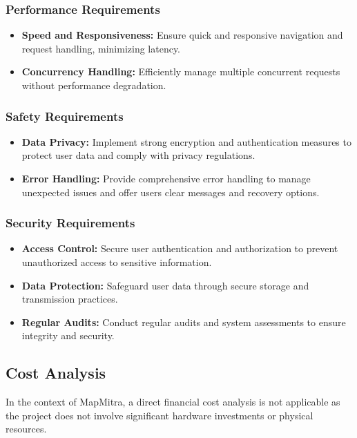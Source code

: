 \subsubsection*{Performance Requirements}
\begin{itemize}
	\item \textbf{Speed and Responsiveness:} Ensure quick and responsive navigation and request handling, minimizing latency.
	\item \textbf{Concurrency Handling:} Efficiently manage multiple concurrent requests without performance degradation.
\end{itemize}

\subsubsection*{Safety Requirements}
\begin{itemize}
	\item \textbf{Data Privacy:} Implement strong encryption and authentication measures to protect user data and comply with privacy regulations.
	\item \textbf{Error Handling:} Provide comprehensive error handling to manage unexpected issues and offer users clear messages and recovery options.
\end{itemize}

\subsubsection*{Security Requirements}
\begin{itemize}
	\item \textbf{Access Control:} Secure user authentication and authorization to prevent unauthorized access to sensitive information.
	\item \textbf{Data Protection:} Safeguard user data through secure storage and transmission practices.
	\item \textbf{Regular Audits:} Conduct regular audits and system assessments to ensure integrity and security.
\end{itemize}

\subsection{Cost Analysis}
In the context of MapMitra, a direct financial cost analysis is not applicable as the project does not involve significant hardware investments or physical resources.

